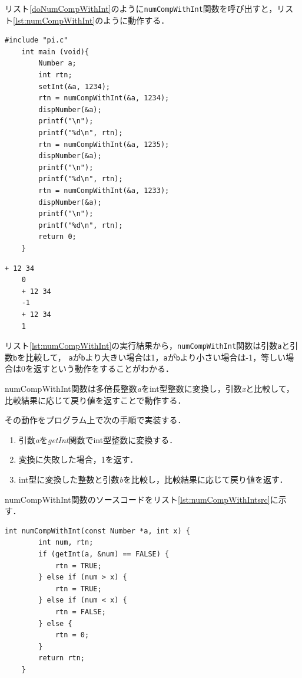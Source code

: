 \documentclass[a4paper,11pt,dvipdfmx]{jsarticle}
\begin{document}
リスト\ref{doNumCompWithInt}のように\texttt{numCompWithInt}関数を呼び出すと，リスト\ref{lst:numCompWithInt}のように動作する．

\begin{lstlisting}[caption=\texttt{numCompWithInt}関数の呼び出し,label=doNumCompWithInt]
    #include "pi.c"
    int main (void){
        Number a;
        int rtn;
        setInt(&a, 1234);
        rtn = numCompWithInt(&a, 1234);
        dispNumber(&a);
        printf("\n");
        printf("%d\n", rtn);
        rtn = numCompWithInt(&a, 1235);
        dispNumber(&a);
        printf("\n");
        printf("%d\n", rtn);
        rtn = numCompWithInt(&a, 1233);
        dispNumber(&a);
        printf("\n");
        printf("%d\n", rtn);
        return 0;
    }
\end{lstlisting}

\begin{lstlisting}[caption=リスト\ref{doNumCompWithInt}の実行結果,label=lst:numCompWithInt]
    + 12 34
    0
    + 12 34
    -1
    + 12 34
    1
\end{lstlisting}

リスト\ref{lst:numCompWithInt}の実行結果から，\texttt{numCompWithInt}関数は引数\texttt{a}と引数\texttt{b}を比較して，
\texttt{a}が\texttt{b}より大きい場合は1，\texttt{a}が\texttt{b}より小さい場合は-1，等しい場合は0を返すという動作をすることがわかる．

numCompWithInt関数は多倍長整数\textit{a}をint型整数に変換し，引数\textit{x}と比較して，比較結果に応じて戻り値を返すことで動作する．

その動作をプログラム上で次の手順で実装する．
\begin{enumerate}
    \item 引数\textit{a}を\textit{getInt}関数でint型整数に変換する．
    \item 変換に失敗した場合，1を返す．
    \item int型に変換した整数と引数\textit{b}を比較し，比較結果に応じて戻り値を返す．
\end{enumerate}

numCompWithInt関数のソースコードをリスト\ref{lst:numCompWithIntsrc}に示す．

\begin{lstlisting}[caption=\texttt{numCompWithInt}関数,label=lst:numCompWithIntsrc]
    int numCompWithInt(const Number *a, int x) {
        int num, rtn;
        if (getInt(a, &num) == FALSE) {
            rtn = TRUE;
        } else if (num > x) {
            rtn = TRUE;
        } else if (num < x) {
            rtn = FALSE;
        } else {
            rtn = 0;
        }
        return rtn;
    }
\end{lstlisting}
\end{document}
